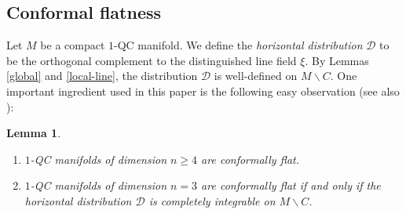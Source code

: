 \documentclass[10pt]{amsart}
\let\mathcal\mathscr
\let\moins\smallsetminus
\newtheorem{lemma}[theorem]{Lemma}
\theoremstyle{definition}
\theoremstyle{remark}
\numberwithin{equation}{section}
\providecommand{\skpt}{\par\smallskip\noindent}
\begin{document}
\subsection{Conformal flatness}\label{section-conformal}
Let $M$ be a compact $1$-QC manifold. We define the \emph{horizontal distribution} $\mathcal D$ to be the
orthogonal complement to the distinguished line field $\xi$. By Lemmas \ref{global} and \ref{local-line}, the distribution
$\mathcal D$ is well-defined on $M\moins C$.
One important ingredient used in this paper is the
following easy observation (see also \cite{BF,GM}):

\skpt
\begin{lemma}\label{conformal}
\begin{enumerate}
\item
$1$-QC manifolds of dimension $n\geq4$ are conformally flat.
\item $1$-QC manifolds of dimension $n=3$ are conformally flat if and only if
the horizontal distribution $\mathcal D$ is completely integrable on $M\moins C$.
\end{enumerate}
\end{lemma}
\end{document}
